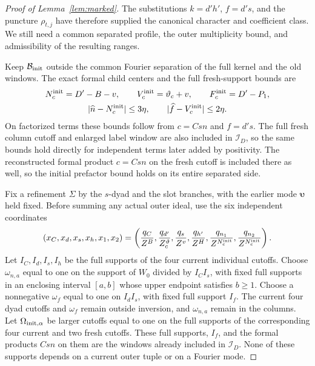 \documentclass[12pt]{article}
\begin{document}
\begin{proof}[Proof of Lemma~\ref{lem:marked}]
The substitutions \(k=d'h'\), \(f=d's\), and the puncture
\(\rho_{t,j}\) have therefore supplied the canonical character and
coefficient class.  We still need a common separated profile, the
outer multiplicity bound, and admissibility of the resulting ranges.

Keep \(\mathcal B_{\rm init}\) outside the common Fourier separation
of the full kernel and the old windows.  The exact
formal child centers and the full fresh-support bounds are
\begin{equation}\label{eq:initial-canonical-lengths}
 \begin{gathered}
 N_c^{\rm init}=D'-B-v,\qquad V_c^{\rm init}=\vartheta_c+v,\qquad
 F_c^{\rm init}=D'-P_1,\\
 |\widehat n-N_c^{\rm init}|\le3\eta,\qquad
 |\widehat f-V_c^{\rm init}|\le2\eta.
 \end{gathered}
\end{equation}
On factorized terms these bounds follow from \(c=Csn\) and \(f=d's\).
The full fresh column cutoff and enlarged label window are also included
in \(\mathcal I_D\), so the same bounds hold directly for independent
terms later added by positivity.  The reconstructed formal product
\(c=Csn\) on the fresh cutoff is included there as well, so the initial
prefactor bound holds on its entire separated side.

Fix a refinement \(\Sigma\) by the \(s\)-dyad and the slot branches,
with the earlier mode \(\boldsymbol\upsilon\) held fixed.  Before
summing any actual outer ideal, use the six independent coordinates
\[
 (x_C,x_d,x_s,x_h,x_1,x_2)
 =\left(\frac{q_C}{Z^B},\frac{q_{d'}}{Z^\vartheta_c},
 \frac{q_s}{Z^v},\frac{q_{h'}}{Z^H},
 \frac{q_{n_1}}{Z^{N_c^{\rm init}}},
 \frac{q_{n_2}}{Z^{N_c^{\rm init}}}\right).
\]
Let \(I_C,I_d,I_s,I_h\) be the full supports of the four current
individual cutoffs.  Choose \(\omega_{n,a}\) equal to one on the
support of \(W_0\) divided by \(I_CI_s\), with fixed full supports
in an enclosing interval \([a,b]\) whose upper endpoint satisfies
\(b\ge1\).  Choose a nonnegative \(\omega_f\) equal to one on
\(I_dI_s\), with fixed full support \(I_f\).  The current four dyad
cutoffs and \(\omega_f\) remain outside inversion, and
\(\omega_{n,a}\) remain in the columns.  Let
\(\Omega_{{\rm init},\alpha}\) be larger cutoffs equal to one on the
full supports of the corresponding four current and two fresh cutoffs.
These full supports, \(I_f\), and the formal products \(Csn\) on them
are the windows already included in \(\mathcal I_D\).  None of these
supports depends on a current outer tuple or on a Fourier mode.


\end{proof}
\end{document}
